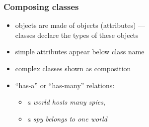 \documentclass{slides}
\begin{document}
\begin{frame}
    \frametitle{Composing classes}

  \begin{center}
  \end{center}

    \begin{itemize}
    \item objects are made of objects (\alert{attributes}) ---\\
      classes declare the types of these objects
    \item simple attributes appear below class name
    \item complex classes shown as \alert{composition}
    \item ``has-a'' or ``has-many'' relations:
      \begin{itemize}
        \item \emph{a world hosts many spies},
        \item \emph{a spy belongs to one world}
      \end{itemize}
    \end{itemize}

\end{frame}
\end{document}
